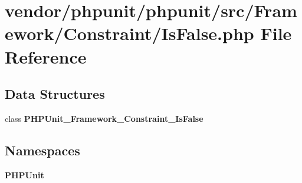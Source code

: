 \section{vendor/phpunit/phpunit/src/\+Framework/\+Constraint/\+Is\+False.php File Reference}
\label{_is_false_8php}
\subsection*{Data Structures}
\begin{DoxyCompactItemize}
\item 
class {\bf P\+H\+P\+Unit\+\_\+\+Framework\+\_\+\+Constraint\+\_\+\+Is\+False}
\end{DoxyCompactItemize}
\subsection*{Namespaces}
\begin{DoxyCompactItemize}
\item 
 {\bf P\+H\+P\+Unit}
\end{DoxyCompactItemize}
